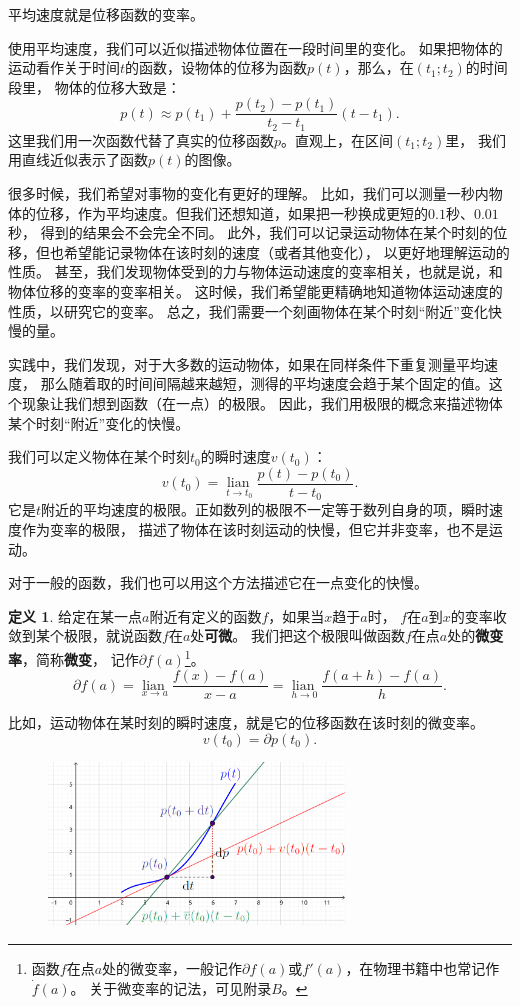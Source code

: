 \documentclass[12pt,UTF8]{ctexbook}
\newcommand{\lian}[1]{
    \underset{#1}{\operatorname{lian}\,}
}
\theoremstyle{definition}
\newtheorem{df}{定义}[section]
\theoremstyle{plain}
\begin{document}
平均速度就是位移函数的变率。

使用平均速度，我们可以近似描述物体位置在一段时间里的变化。
如果把物体的运动看作关于时间$t$的函数，设物体的位移为函数$p(t)$，那么，在$(t_1; t_2)$的时间段里，
物体的位移大致是：
$$ p(t) \approx p(t_1) + \frac{p(t_2) - p(t_1)}{t_2 - t_1}(t - t_1).$$
这里我们用一次函数代替了真实的位移函数$p$。直观上，在区间$(t_1; t_2)$里，
我们用直线近似表示了函数$p(t)$的图像。

很多时候，我们希望对事物的变化有更好的理解。
比如，我们可以测量一秒内物体的位移，作为平均速度。但我们还想知道，如果把一秒换成更短的$0.1$秒、$0.01$秒，
得到的结果会不会完全不同。
此外，我们可以记录运动物体在某个时刻的位移，但也希望能记录物体在该时刻的速度（或者其他变化），
以更好地理解运动的性质。
甚至，我们发现物体受到的力与物体运动速度的变率相关，也就是说，和物体位移的变率的变率相关。
这时候，我们希望能更精确地知道物体运动速度的性质，以研究它的变率。
总之，我们需要一个刻画物体在某个时刻“附近”变化快慢的量。

实践中，我们发现，对于大多数的运动物体，如果在同样条件下重复测量平均速度，
那么随着取的时间间隔越来越短，测得的平均速度会趋于某个固定的值。这个现象让我们想到函数（在一点）的极限。
因此，我们用极限的概念来描述物体某个时刻“附近”变化的快慢。

我们可以定义物体在某个时刻$t_0$的瞬时速度$v(t_0)$：
$$ v(t_0) = \lian{t\to t_0} \frac{p(t) - p(t_0)}{t - t_0}.$$
它是$t$附近的平均速度的极限。正如数列的极限不一定等于数列自身的项，瞬时速度作为变率的极限，
描述了物体在该时刻运动的快慢，但它并非变率，也不是运动。

对于一般的函数，我们也可以用这个方法描述它在一点变化的快慢。

\begin{df}\label{df:2-1-0}
    给定在某一点$a$附近有定义的函数$f$，如果当$x$趋于$a$时，
    $f$在$a$到$x$的变率收敛到某个极限，就说函数$f$在$a$处\textbf{可微}。
    我们把这个极限叫做函数$f$在点$a$处的\textbf{微变率}，简称\textbf{微变}，
    记作$\partial f(a)$\footnote{函数$f$在点$a$处的微变率，一般记作$\partial f(a)$或$f'(a)$，在物理书籍中也常记作$\dot{f}(a)$。
    关于微变率的记法，可见附录$B$。}。
    $$ \partial f(a) = \lian{x\to a} \frac{f(x) - f(a)}{x - a} = \lian{h\to 0} \frac{f(a + h) - f(a)}{h}.$$
\end{df}

比如，运动物体在某时刻的瞬时速度，就是它的位移函数在该时刻的微变率。
$$ v(t_0) = \partial p(t_0).$$

\begin{figure}[h]
    \vspace{4pt}
    \centering
    \includegraphics[width=0.7\textwidth]{tu/导数1.png}
\end{figure}
\end{document}
